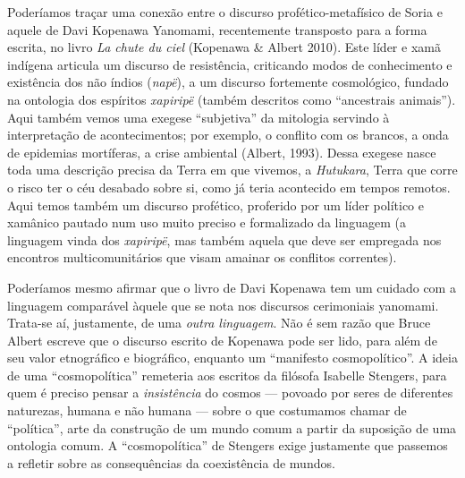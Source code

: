 {{Poderíamos traçar uma conexão entre o discurso profético-metafísico de
Soria e aquele de Davi Kopenawa Yanomami, recentemente transposto para
a forma escrita, no livro \emph{La chute du ciel} (Kopenawa \& Albert 2010).
Este líder e xamã indígena articula um discurso de resistência,
criticando modos de conhecimento e existência dos não índios (\emph{napë}), a
um discurso fortemente cosmológico, fundado na ontologia dos espíritos
\emph{xapiripë} (também descritos como ``ancestrais animais''). Aqui também
vemos uma exegese ``subjetiva'' da mitologia servindo à interpretação de
acontecimentos; por exemplo, o conflito com os brancos, a onda de
epidemias mortíferas, a crise ambiental (Albert, 1993). Dessa exegese
nasce toda uma descrição precisa da Terra em que vivemos, a \emph{Hutukara},
Terra que corre o risco ter o céu desabado sobre si, como já teria
acontecido em tempos remotos. Aqui temos também um discurso profético,
proferido por um líder político e xamânico pautado num uso muito
preciso e formalizado da linguagem (a linguagem vinda dos \emph{xapiripë}, mas
também aquela que deve ser empregada nos encontros multicomunitários
que visam amainar os conflitos correntes). 

Poderíamos mesmo afirmar que o livro de Davi Kopenawa tem um cuidado com
a linguagem comparável àquele que se nota nos discursos cerimoniais
yanomami. Trata-se aí, justamente, de uma \emph{outra linguagem}. Não é sem
razão que Bruce Albert escreve que o discurso escrito de Kopenawa pode
ser lido, para além de seu valor etnográfico e biográfico, enquanto um
``manifesto cosmopolítico''. A ideia de uma ``cosmopolítica'' remeteria aos
escritos da filósofa Isabelle Stengers, para quem é preciso pensar a
\emph{insistência} do cosmos --- povoado por seres de diferentes naturezas,
humana e não humana --- sobre o que costumamos chamar de ``política'', arte
da construção de um mundo comum a partir da suposição de uma ontologia
comum. A ``cosmopolítica'' de Stengers exige justamente que passemos a
refletir sobre as consequências da coexistência de mundos.

}}
